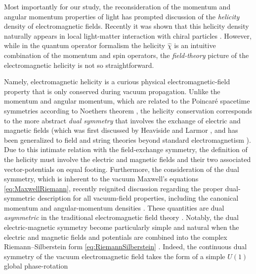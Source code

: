 \documentclass[1p,sort&compress]{elsarticle}
\numberwithin{equation}{section}
\begin{document}
Most importantly for our study, the reconsideration of the momentum and angular momentum properties of light has prompted discussion of the \emph{helicity} density of electromagnetic fields.  Recently it was shown that this helicity density naturally appears in local light-matter interaction with chiral particles \cite{Tang2010,Hendry2010,Bliokh2011,Tang2011,Andrews2012,Hendry2012,Schaferling2012,Bliokh2013c}. However, while in the quantum operator formalism the helicity $\hat{\chi}$ is an intuitive combination of the momentum and spin operators, the \emph{field-theory} picture of the electromagnetic helicity is not so straightforward.

Namely, electromagnetic helicity \cite{Candlin1965,Calkin1965,Oconnell1965,Zwanziger1968,Deser1976,Afanasiev1996,Trueba1996,
Cameron2012b,Bliokh2013,Cameron2012,Fernandez2012,Fernandez2013} is a curious physical electromagnetic-field property that is only conserved during vacuum propagation. Unlike the momentum and angular momentum, which are related to the Poincar\'{e} spacetime symmetries according to Noethers theorem \cite{Noether1918}, the helicity conservation corresponds to the more abstract \emph{dual symmetry} that involves the exchange of electric and magnetic fields \cite{Calkin1965,Zwanziger1968,Deser1976,Cameron2012b,Bliokh2013,Cameron2012,Fernandez2012,Fernandez2013} (which was first discussed by Heaviside and Larmor \cite{Heaviside1892,Larmor1897}, and has been generalized to field and string theories beyond standard electromagnetism \cite{Born1934,Schrodinger1935,Ferrara1977,Gaillard1981,Sen1993,Schwarz1994,Pasti1995b,Gibbons1995,Hull1995,Deser1998,Cremmer1998,Figueroa-O'Farrill,Aschieri2008,Aschieri2014}). Due to this intimate relation with the field-exchange symmetry, the definition of the helicity must involve the electric and magnetic fields and their two associated vector-potentials on equal footing.  Furthermore, the consideration of the dual symmetry, which is inherent to the vacuum Maxwell's equations \eqref{eq:MaxwellRiemann}, recently reignited discussion regarding the proper dual-symmetric description for all vacuum-field properties, including the canonical momentum and angular-momentum densities \cite{Berry2009,Barnett2010,Cameron2012,Bliokh2013}. These quantities are dual \emph{asymmetric} in the traditional electromagnetic field theory \cite{Soper1976,Bliokh2013}.  Notably, the dual electric-magnetic symmetry become particularly simple and natural when the electric and magnetic fields and potentials are combined into the complex Riemann--Silberstein form \eqref{eq:RiemannSilberstein} \cite{Gaillard1981,Bliokh2013}. Indeed, the continuous dual symmetry of the vacuum electromagnetic field takes the form of a simple $U(1)$ global phase-rotation 
\end{document}

